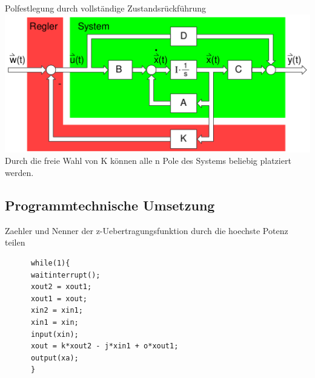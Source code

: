\documentclass[10pt,a4paper]{article}
\begin{document}
  Polfestlegung durch vollständige Zustandsrückführung\\
  \includegraphics[width=.5\textwidth]{Figures/Polfestlegung.png}
  Durch die freie Wahl von K können alle n Pole des Systems beliebig platziert werden.
  \subsection{Programmtechnische Umsetzung}
Zaehler und Nenner der z-Uebertragungsfunktion durch die hoechste Potenz teilen\\
  \begin{mdframed}[style=exercise]
    \begin{lstlisting}
      while(1){
      waitinterrupt();
      xout2 = xout1;
      xout1 = xout;
      xin2 = xin1;
      xin1 = xin;
      input(xin);
      xout = k*xout2 - j*xin1 + o*xout1;
      output(xa);
      }
    \end{lstlisting}
  \end{mdframed}
\end{document}
